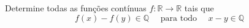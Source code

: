 Determine todas as funções contínuas \(f\colon  \mathbb{R}\to \mathbb{R}\) tais que
\[ f(x)-f(y)\in \mathbb{Q}\quad \text{ para todo }\quad x-y\in\mathbb{Q} \]
